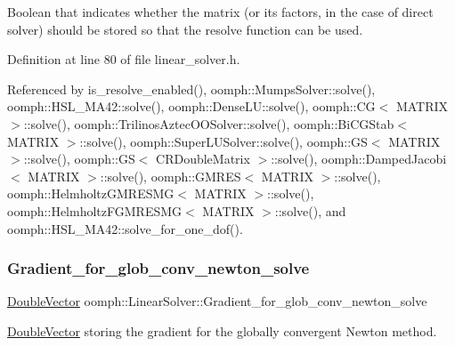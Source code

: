 Boolean that indicates whether the matrix (or its factors, in the case of direct solver) should be stored so that the resolve function can be used. 



Definition at line 80 of file linear\+\_\+solver.\+h.



Referenced by is\+\_\+resolve\+\_\+enabled(), oomph\+::\+Mumps\+Solver\+::solve(), oomph\+::\+H\+S\+L\+\_\+\+M\+A42\+::solve(), oomph\+::\+Dense\+L\+U\+::solve(), oomph\+::\+C\+G$<$ M\+A\+T\+R\+I\+X $>$\+::solve(), oomph\+::\+Trilinos\+Aztec\+O\+O\+Solver\+::solve(), oomph\+::\+Bi\+C\+G\+Stab$<$ M\+A\+T\+R\+I\+X $>$\+::solve(), oomph\+::\+Super\+L\+U\+Solver\+::solve(), oomph\+::\+G\+S$<$ M\+A\+T\+R\+I\+X $>$\+::solve(), oomph\+::\+G\+S$<$ C\+R\+Double\+Matrix $>$\+::solve(), oomph\+::\+Damped\+Jacobi$<$ M\+A\+T\+R\+I\+X $>$\+::solve(), oomph\+::\+G\+M\+R\+E\+S$<$ M\+A\+T\+R\+I\+X $>$\+::solve(), oomph\+::\+Helmholtz\+G\+M\+R\+E\+S\+M\+G$<$ M\+A\+T\+R\+I\+X $>$\+::solve(), oomph\+::\+Helmholtz\+F\+G\+M\+R\+E\+S\+M\+G$<$ M\+A\+T\+R\+I\+X $>$\+::solve(), and oomph\+::\+H\+S\+L\+\_\+\+M\+A42\+::solve\+\_\+for\+\_\+one\+\_\+dof().

\mbox{\label{classoomph_1_1LinearSolver_ad38255ae12611787a857cc5c90ffa9f8}} 
\subsubsection{\texorpdfstring{Gradient\+\_\+for\+\_\+glob\+\_\+conv\+\_\+newton\+\_\+solve}{Gradient\_for\_glob\_conv\_newton\_solve}}
{\footnotesize\ttfamily \hyperlink{classoomph_1_1DoubleVector}{Double\+Vector} oomph\+::\+Linear\+Solver\+::\+Gradient\+\_\+for\+\_\+glob\+\_\+conv\+\_\+newton\+\_\+solve\hspace{0.3cm}{\ttfamily [protected]}}



\hyperlink{classoomph_1_1DoubleVector}{Double\+Vector} storing the gradient for the globally convergent Newton method. 



